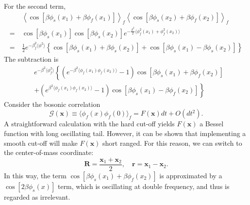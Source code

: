 For the second term,
\begin{equation}
\begin{aligned}
	&\ \left\langle \cos\left[\beta\phi_s(x_1)+\beta\phi_f(x_1)\right]\right\rangle_f \left\langle \cos\left[\beta\phi_s(x_2)+\beta\phi_f(x_2)\right]\right\rangle_f \\
	=&\ \cos[\beta\phi_s(x_1)]\cos[\beta\phi_s(x_2)] e^{-\frac{\beta^2}{2}\langle\phi_f^2(x_1)+\phi_f^2(x_2)\rangle} \\
	=&\ \frac{1}{2}e^{-\beta_f^2 \langle \phi^2\rangle} \left\{ \cos[\beta\phi_s(x_1)+\beta\phi_s(x_2)] + \cos[\beta\phi_s(x_1)-\beta\phi_s(x_2)] \right\}
\end{aligned}
\end{equation}
The subtraction is
\begin{equation}
\begin{aligned}
	& e^{-\beta^2\langle\phi_f^2\rangle} \left\{
		\left(e^{-\beta^2 \langle\phi_f(x_1)\phi_f(x_2)\rangle}-1 \right)\cos\left[\beta\phi_s(x_1) +\beta\phi_f(x_2)\right] \right. \\
	& + \left. \left(e^{\beta^2 \langle\phi_f(x_1)\phi_f(x_2)\rangle}-1 \right)\cos\left[\beta\phi_s(x_1) -\beta\phi_f(x_2)\right] \right\}
\end{aligned}
\end{equation}
Consider the bosonic correlation
\begin{equation}
	\mathcal G(\bm x) \equiv \langle \phi_f(x) \phi_f(0)\rangle_f = F(\bm x) dt + O(dt^2).
\end{equation}
A straightforward calculation with the hard cut-off yields $F(\bm x)$ a Bessel function with long oscillating tail.
However, it can be shown that implementing a smooth cut-off will make $F(\bm x)$ short ranged.
For this reason, we can switch to the center-of-mass coordinate:
\begin{equation}
	\bm R = \frac{\bm x_1 + \bm x_2}{2}, \quad \bm r = \bm x_1 - \bm x_2.
\end{equation}
In this way, the term $\cos\left[\beta\phi_s(x_1) +\beta\phi_f(x_2)\right]$ is approximated by a $\cos\left[2\beta\phi_s(x)\right]$ term, which is oscillating at double frequency, and thus is regarded as irrelevant.

